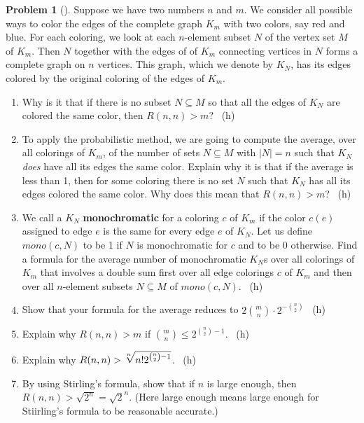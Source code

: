 \documentclass[10pt,]{book}
\newcommand{\terminology}[1]{\textbf{#1}}
\theoremstyle{plain}
\theoremstyle{definition}
\newtheorem{activity}[project]{Problem}
\theoremstyle{definition}
\numberwithin{equation}{chapter}
\newcommand{\importantarrow}{\Rightarrow}
\begin{document}
\begin{activity}[]\marginsymbol[-1em]{\pdftooltip{$\importantarrow$}{especially interesting}} \label{activity-86}
\hypertarget{p-518}{}%
Suppose we have two numbers \(n\) and \(m\). We consider all possible ways to color the edges of the complete graph \(K_m\) with two colors, say red and blue. For each coloring, we look at each \(n\)-element subset \(N\) of the vertex set \(M\) of \(K_m\). Then \(N\) together with the edges of of \(K_m\) connecting vertices in \(N\) forms a complete graph on \(n\) vertices. This graph, which we denote by \(K_N\), has its edges colored by the original coloring of the edges of \(K_m\).%
\begin{enumerate}[font=\bfseries,label=(\alph*),ref=\alph*]
\item\label{task-80} \marginsymbol[-2.5em]{} \hypertarget{p-519}{}%
Why is it that if there is no subset \(N\subseteq M\) so that all the edges of \(K_N\) are colored the same color, then \(R(n,n)>m\)?%
~{\tiny (h)}\item\label{task-81} \marginsymbol[-2.5em]{} \hypertarget{p-522}{}%
To apply the probabilistic method, we are going to compute the average, over all colorings of \(K_m\), of the number of sets \(N\subseteq M\) with \(|N|=n\) such that \(K_N\) \emph{does} have all its edges the same color. Explain why it is that if the average is less than 1, then for some coloring there is no set \(N\) such that \(K_N\) has all its edges colored the same color.  Why does this mean that \(R(n,n)>m\)?%
~{\tiny (h)}\item\label{task-82} \marginsymbol[-2.5em]{} \hypertarget{p-525}{}%
We call a \(K_N\) \terminology{monochromatic} for a coloring \(c\) of \(K_m\) if the color \(c(e)\) assigned to edge \(e\) is the same for every edge \(e\) of \(K_N\).  Let us define \({ mono}(c,N)\) to be 1 if \(N\) is monochromatic for \(c\) and to be 0 otherwise.  Find a formula for the average number of monochromatic \(K_N\)s over all colorings of \(K_m\) that involves a double sum first over all edge colorings \(c\) of \(K_m\) and then over all \(n\)-element subsets \(N\subseteq M\) of \({
mono}(c,N)\).%
~{\tiny (h)}\item\label{task-83} \marginsymbol[-2.5em]{} \hypertarget{p-528}{}%
Show that your formula for the average reduces to \(2\binom{m}{n}\cdot2^{-\binom{n}{2}}\)%
~{\tiny (h)}\item\label{task-84} \marginsymbol[-2.5em]{} \hypertarget{p-531}{}%
Explain why \(R(n,n)>m\) if \(\binom{m}{n}\le 2^{\binom{n}{2} -1}\).%
~{\tiny (h)}\item\label{task-85}  \hypertarget{p-534}{}%
Explain why \(R(n,n)>\root n \of {n!2^{\binom{n}{2}-1}}\).%
~{\tiny (h)}\item\label{task-86} \marginsymbol[-2.5em]{} \hypertarget{p-537}{}%
By using Stirling's formula, show that if \(n\) is large enough, then \(R(n,n) > \sqrt{2^n} = \sqrt{2}^{n}\).  (Here large enough means large enough for Stiirling's formula to be reasonable accurate.)%
\end{enumerate}
\end{activity}
\end{document}
